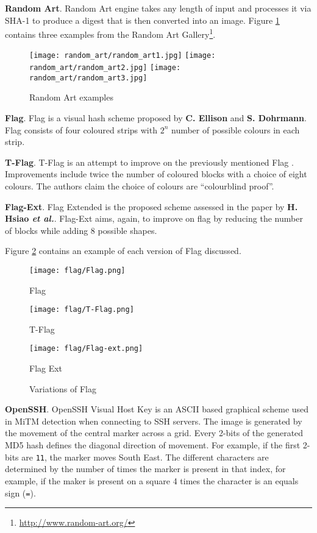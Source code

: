 \textbf{Random Art}. Random Art engine\cite{perrig1999hash} takes any length of input and processes it via SHA-1 to produce a digest that is then converted into an image. Figure \ref{fig:randomArt} contains three examples from the Random Art Gallery\footnote{\url{http://www.random-art.org/}}.

\begin{figure}[h!]
    \centering
        \texttt{[image: random\_art/random\_art1.jpg]}
    \endminipage
        \texttt{[image: random\_art/random\_art2.jpg]}
    \endminipage
        \texttt{[image: random\_art/random\_art3.jpg]}
    \endminipage
    \caption{Random Art examples}
    \label{fig:randomArt}
\end{figure}

\textbf{Flag}. Flag is a visual hash scheme proposed by \textbf{C. Ellison} and \textbf{S. Dohrmann}\cite{ellison2003public}. Flag consists of four coloured strips with $2^n$ number of possible colours in each strip. 

\textbf{T-Flag}. T-Flag is an attempt to improve on the previously mentioned Flag \cite{lin2010spate}. Improvements include twice the number of coloured blocks with a choice of eight colours. The authors claim the choice of colours are ``colourblind proof''.

\textbf{Flag-Ext}. Flag Extended is the proposed scheme assessed in the paper by \textbf{H. Hsiao \textit{et al.}}\cite{hsiao2009study}. Flag-Ext aims, again, to improve on flag by reducing the number of blocks while adding 8 possible shapes.

Figure \ref{fig:flag} contains an example of each version of Flag discussed.

\begin{figure}[h!]
    \centering
        \texttt{[image: flag/Flag.png]}
        \caption{Flag}
    \endminipage
        \texttt{[image: flag/T-Flag.png]}
        \caption{T-Flag}
    \endminipage
        \texttt{[image: flag/Flag-ext.png]}
        \caption{Flag Ext}
    \endminipage
    \caption{Variations of Flag}
    \label{fig:flag}
\end{figure}

\textbf{OpenSSH}. OpenSSH Visual Host Key is an ASCII based graphical scheme used in MiTM detection when connecting to SSH servers. The image is generated by the movement of the central marker across a grid. Every 2-bits of the generated MD5 hash defines the diagonal direction of movement. For example, if the first 2-bits are \verb|11|, the marker moves South East. The different characters are determined by the number of times the marker is present in that index, for example, if the maker is present on a square 4 times the character is an equals sign (\verb|=|).

